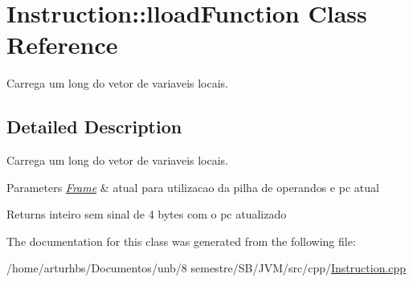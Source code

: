 \hypertarget{classInstruction_1_1lloadFunction}{}\section{Instruction\+:\+:lload\+Function Class Reference}
\label{classInstruction_1_1lloadFunction}


Carrega um long do vetor de variaveis locais.  




\subsection{Detailed Description}
Carrega um long do vetor de variaveis locais. 


\begin{DoxyParams}{Parameters}
{\em \hyperlink{classFrame}{Frame}} & atual para utilizacao da pilha de operandos e pc atual \\
\hline
\end{DoxyParams}
\begin{DoxyReturn}{Returns}
inteiro sem sinal de 4 bytes com o pc atualizado 
\end{DoxyReturn}


The documentation for this class was generated from the following file\+:\begin{DoxyCompactItemize}
\item 
/home/arturhbs/\+Documentos/unb/8 semestre/\+S\+B/\+J\+V\+M/src/cpp/\hyperlink{Instruction_8cpp}{Instruction.\+cpp}\end{DoxyCompactItemize}
